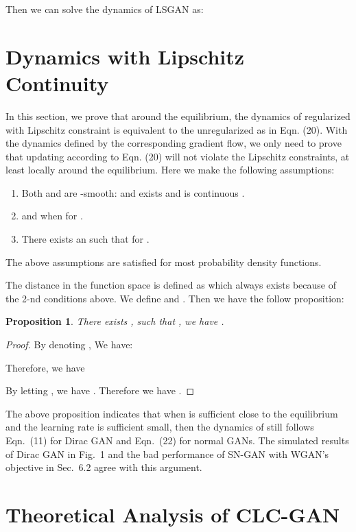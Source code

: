 \documentclass{article}
\newtheorem{proposition}{Proposition}
\theoremstyle{definition}
\begin{document}
Then we can solve the dynamics of LSGAN as:



\section{Dynamics with Lipschitz Continuity}

In this section, we prove that around the equilibrium, the dynamics of regularized  with Lipschitz constraint is equivalent to the unregularized  as in Eqn. (20). 
With the dynamics defined by the corresponding gradient flow, we only need to prove that updating  according to Eqn. (20) will not violate the Lipschitz constraints, at least locally around the equilibrium. Here we make the following assumptions:
\begin{enumerate}
    \item Both  and  are -smooth:  and  exists and is continuous .
    \item  and  when  for .
    \item There exists an  such that  for .
\end{enumerate}
The above assumptions are satisfied for most probability density functions.

The distance in the function space is defined as  which always exists because of the 2-nd conditions above. We define  and .
Then we have the follow proposition:

\begin{proposition}
There exists , such that , we have . 
\end{proposition}

\begin{proof}
By denoting , We have:

Therefore, we have 

By letting , we have . Therefore we have .
\end{proof}

The above proposition indicates that when  is sufficient close to the equilibrium and the learning rate is sufficient small, then the dynamics of  still follows Eqn.~(11) for Dirac GAN and Eqn.~(22) for normal GANs. The simulated results of Dirac GAN in Fig.~1 and the bad performance of SN-GAN with WGAN's objective in Sec.~6.2 agree with this argument.

\section{Theoretical Analysis of CLC-GAN}
\end{document}

